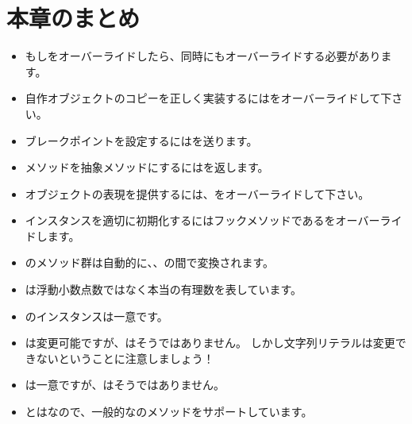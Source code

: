 \documentclass[a4paper,10pt,twoside]{book}
\begin{document}

\section{本章のまとめ}

\begin{itemize}

  \item もし\ct{=}をオーバーライドしたら、同時にもオーバーライドする必要があります。

  \item 自作オブジェクトのコピーを正しく実装するにはをオーバーライドして下さい。

  \item ブレークポイントを設定するにはを送ります。

  \item メソッドを抽象メソッドにするにはを返します。

  \item オブジェクトの表現を提供するには、をオーバーライドして下さい。

  \item インスタンスを適切に初期化するにはフックメソッドであるをオーバーライドします。

  \item {}のメソッド群は自動的に、、の間で変換されます。

  \item {}は浮動小数点数ではなく本当の有理数を表しています。

  \item {}のインスタンスは一意です。

  \item {}は変更可能ですが、はそうではありません。
  しかし文字列リテラルは変更できないということに注意しましょう！

  \item {}は一意ですが、はそうではありません。

  \item {}とはなので、一般的なのメソッドをサポートしています。

\end{itemize}

\ifx\wholebook\relax\else
   
   
\end{document}
